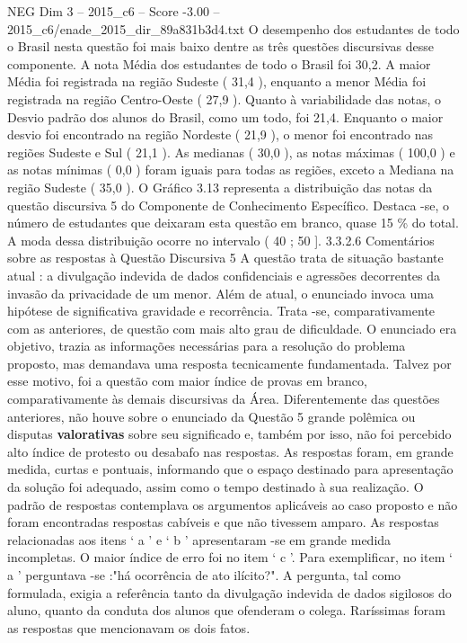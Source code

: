\begin{textsample}{NEG Dim 3 – 2015\_c6 – Score -3.00 – 2015\_c6/enade\_2015\_dir\_89a831b3d4.txt}
O desempenho dos estudantes de todo o Brasil nesta questão foi mais baixo dentre as três questões discursivas desse componente.
A nota Média dos estudantes de todo o Brasil foi 30,2.
A maior Média foi registrada na região Sudeste ( 31,4 ), enquanto a menor Média foi registrada na região Centro-Oeste ( 27,9 ).
Quanto à variabilidade das notas, o Desvio padrão dos alunos do Brasil, como um todo, foi 21,4.
Enquanto o maior desvio foi encontrado na região Nordeste ( 21,9 ), o menor foi encontrado nas regiões Sudeste e Sul ( 21,1 ).
As medianas ( 30,0 ), as notas máximas ( 100,0 ) e as notas mínimas ( 0,0 ) foram iguais para todas as regiões, exceto a Mediana na região Sudeste ( 35,0 ).
O Gráfico 3.13 representa a distribuição das notas da questão discursiva 5 do Componente de Conhecimento Específico.
Destaca -se, o número de estudantes que deixaram esta questão em branco, quase 15 \% do total.
A moda dessa distribuição ocorre no intervalo ( 40 ; 50 ]. 3.3.2.6 Comentários sobre as respostas à Questão Discursiva 5 A questão trata de situação bastante atual : a divulgação indevida de dados confidenciais e agressões decorrentes da invasão da privacidade de um menor.
Além de atual, o enunciado invoca uma hipótese de significativa gravidade e recorrência.
Trata -se, comparativamente com as anteriores, de questão com mais alto grau de dificuldade.
O enunciado era objetivo, trazia as informações necessárias para a resolução do problema proposto, mas demandava uma resposta tecnicamente fundamentada.
Talvez por esse motivo, foi a questão com maior índice de provas em branco, comparativamente às demais discursivas da Área.
Diferentemente das questões anteriores, não houve sobre o enunciado da Questão 5 grande polêmica ou disputas \textbf{valorativas} sobre seu significado e, também por isso, não foi percebido alto índice de protesto ou desabafo nas respostas.
As respostas foram, em grande medida, curtas e pontuais, informando que o espaço destinado para apresentação da solução foi adequado, assim como o tempo destinado à sua realização.
O padrão de respostas contemplava os argumentos aplicáveis ao caso proposto e não foram encontradas respostas cabíveis e que não tivessem amparo.
As respostas relacionadas aos itens ‘ a ’ e ‘ b ’ apresentaram -se em grande medida incompletas.
O maior índice de erro foi no item ‘ c ’.
Para exemplificar, no item ‘ a ’ perguntava -se :"há ocorrência de ato ilícito?".
A pergunta, tal como formulada, exigia a referência tanto da divulgação indevida de dados sigilosos do aluno, quanto da conduta dos alunos que ofenderam o colega.
Raríssimas foram as respostas que mencionavam os dois fatos.

\end{textsample}
